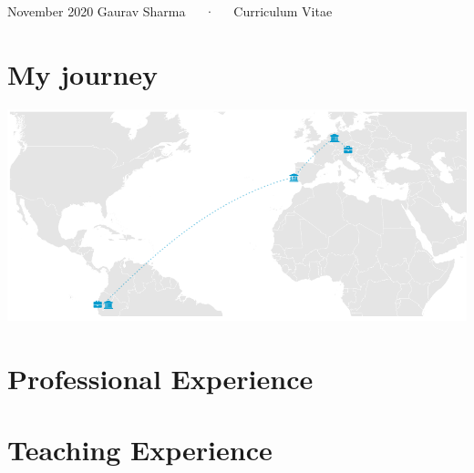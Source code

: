 \documentclass[11pt, a4paper]{awesome-cv}
\begin{document}
\makecvheader

\makecvfooter
  {November 2020}
    {Gaurav Sharma~~~·~~~Curriculum Vitae}
  {\thepage}





\hypertarget{my-journey}{%
\section{\texorpdfstring{ My journey}{ My journey}}\label{my-journey}}

\begin{center}\includegraphics{cv_visual_files/figure-latex/edu_plot-1} \end{center}

\hypertarget{professional-experience}{%
\section{\texorpdfstring{ Professional Experience}{ Professional Experience}}\label{professional-experience}}

\pagebreak

\hypertarget{teaching-experience}{%
\section{\texorpdfstring{ Teaching Experience}{ Teaching Experience}}\label{teaching-experience}}
\end{document}
